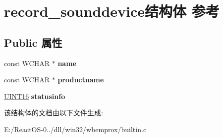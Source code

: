 \hypertarget{structrecord__sounddevice}{}\section{record\+\_\+sounddevice结构体 参考}
\label{structrecord__sounddevice}
\subsection*{Public 属性}
\begin{DoxyCompactItemize}
\item 
\mbox{\label{structrecord__sounddevice_a6a008cfcfbd0e056e71aee9c10b9036c}} 
const W\+C\+H\+AR $\ast$ {\bfseries name}
\item 
\mbox{\label{structrecord__sounddevice_a29205b841df041ea13f0e0327ec75b17}} 
const W\+C\+H\+AR $\ast$ {\bfseries productname}
\item 
\mbox{\label{structrecord__sounddevice_ac261c7fdfccc7a135bfc71b73d1070a7}} 
\hyperlink{_processor_bind_8h_a09f1a1fb2293e33483cc8d44aefb1eb1}{U\+I\+N\+T16} {\bfseries statusinfo}
\end{DoxyCompactItemize}


该结构体的文档由以下文件生成\+:\begin{DoxyCompactItemize}
\item 
E\+:/\+React\+O\+S-\/0../dll/win32/wbemprox/builtin.\+c\end{DoxyCompactItemize}
